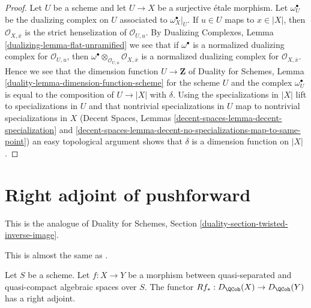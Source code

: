\begin{proof}
Let $U$ be a scheme and let $U \to X$ be a surjective \'etale morphism.
Let $\omega_U^\bullet$ be the dualizing complex on $U$ associated
to $\omega_X^\bullet|_U$.
If $u \in U$ maps to $x \in |X|$, then $\mathcal{O}_{X, \overline{x}}$
is the strict henselization of $\mathcal{O}_{U, u}$. By
Dualizing Complexes, Lemma \ref{dualizing-lemma-flat-unramified}
we see that if $\omega^\bullet$ is a normalized dualizing complex
for $\mathcal{O}_{U, u}$, then
$\omega^\bullet \otimes_{\mathcal{O}_{U, u}} \mathcal{O}_{X, \overline{x}}$
is a normalized dualizing complex for $\mathcal{O}_{X, \overline{x}}$.
Hence we see that the dimension function $U \to \mathbf{Z}$ of
Duality for Schemes, Lemma \ref{duality-lemma-dimension-function-scheme}
for the scheme $U$ and the complex
$\omega_U^\bullet$ is equal to the composition of $U \to |X|$ with $\delta$.
Using the specializations in $|X|$ lift to specializations in $U$
and that nontrivial specializations in $U$ map to
nontrivial specializations in $X$
(Decent Spaces, Lemmas \ref{decent-spaces-lemma-decent-specialization} and
\ref{decent-spaces-lemma-decent-no-specializations-map-to-same-point})
an easy topological argument shows that $\delta$ is a dimension function
on $|X|$.
\end{proof}






\section{Right adjoint of pushforward}
\label{section-twisted-inverse-image}

\noindent
This is the analogue of Duality for Schemes, Section
\ref{duality-section-twisted-inverse-image}.

\begin{lemma}
\label{lemma-twisted-inverse-image}
\begin{reference}
This is almost the same as \cite[Example 4.2]{Neeman-Grothendieck}.
\end{reference}
Let $S$ be a scheme.
Let $f : X \to Y$ be a morphism between quasi-separated and quasi-compact
algebraic spaces over $S$. The functor $Rf_* : D_\QCoh(X) \to D_\QCoh(Y)$
has a right adjoint.
\end{lemma}

